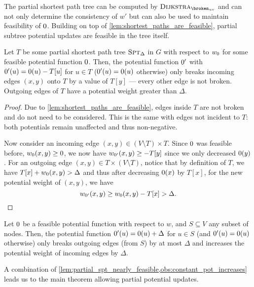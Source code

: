 \noindent The partial shortest path tree can be computed by $\algdk_{\brokuv}$ and can not only determine the consistency of $w'$ but can also be used to maintain feasibility of $\pot$.
Building on top of \cref{lem:shortest_paths_are_feasible}, partial subtree potential updates are feasible in the tree itself.

\begin{lemma}\label{lem:partial_spt_nearly_feasible}
  Let $T$ be some partial shortest path tree $\textsc{Spt}_{\Delta}$ in $G$ with respect to $\wpot$ for some feasible potential function $\pot$.
  Then, the potential function $\pot'$ with $\pot'(u) = \pot(u) - T[u]$ for $u \in T$ ($\pot'(u) = \pot(u)$ otherwise) only breaks incoming edges $(x, y)$ onto $T$ by a value of $T[y]$ --- every other edge is not broken. 
  Outgoing edges of $T$ have a potential weight greater than $\Delta$.
\end{lemma}
\begin{proof}
  Due to \cref{lem:shortest_paths_are_feasible}, edges inside $T$ are not broken and do not need to be considered.
  This is the same with edges not incident to $T$: both potentials remain unaffected and thus non-negative.

  Now consider an incoming edge $(x, y) \in (V \setminus T) \times T$.
  Since $\pot$ was feasible before, \ie $\wpot(x, y) \geq 0$, we now have $w_{\pot'}(x, y) \geq -T[y]$ since we only decreased $\pot(y)$.
  For an outgoing edge $(x, y) \in T \times (V \setminus T)$, notice that by definition of $T$, we have $T[x] + \wpot(x, y) > \Delta$ and thus after decreasing $\pot(x)$ by $T[x]$, for the new potential weight of $(x, y)$, we have \[
    w_{\pot'}(x, y) \geq \wpot(x, y) - T[x] > \Delta.
  \] 
\end{proof}

\begin{observation}\label{obs:constant_pot_increases}
  Let $\pot$ be a feasible potential function with respect to $w$, and $S \subseteq V$ any subset of nodes.
  Then, the potential function $\pot'(u) = \pot(u) + \Delta$ for $u \in S$ (and $\pot'(u) = \pot(u)$ otherwise) only breaks outgoing edges (from $S$) by at most $\Delta$ and increases the potential weight of incoming edges by $\Delta$.
\end{observation}

\noindent A combination of \cref{lem:partial_spt_nearly_feasible,obs:constant_pot_increases} leads us to the main theorem allowing partial potential updates.

